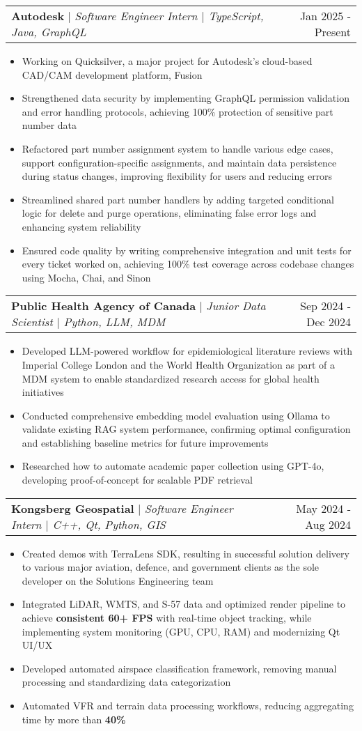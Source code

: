 \documentclass[letterpaper,10pt]{article}
\makeatletter
\newcommand{\resumeItem}[1]{
  \item\small{
    {#1 \vspace{-3pt}}
  }
}
\newcommand{\resumeSubheading}[3]{
    \item
    \begin{tabular*}{0.97\textwidth}[t]{l@{\extracolsep{\fill}}r}
      \textbf{#1} $|$ \textit{ #2} & #3 \\
    \end{tabular*}\vspace{-6pt}
}
\newcommand{\resumeItemListStart}{\begin{itemize}}
\newcommand{\resumeItemListEnd}{\end{itemize}\vspace{-5pt}}
\makeatother
\begin{document}
    \resumeSubheading{Autodesk}{Software Engineer Intern $|$ TypeScript, Java, GraphQL}{Jan 2025 - Present}
        \resumeItemListStart
            \resumeItem{Working on Quicksilver, a major project for Autodesk's cloud-based CAD/CAM development platform, Fusion}
            \resumeItem{Strengthened data security by implementing GraphQL permission validation and error handling protocols, achieving 100\% protection of sensitive part number data}
            \resumeItem{Refactored part number assignment system to handle various edge cases, support configuration-specific assignments, and maintain data persistence during status changes, improving flexibility for users and reducing errors}
            \resumeItem{Streamlined shared part number handlers by adding targeted conditional logic for delete and purge operations, eliminating false error logs and enhancing system reliability}
            \resumeItem{Ensured code quality by writing comprehensive integration and unit tests for every ticket worked on, achieving 100\% test coverage across codebase changes using Mocha, Chai, and Sinon}
    \resumeItemListEnd

    \resumeSubheading{Public Health Agency of Canada}{Junior Data Scientist $|$ Python, LLM, MDM}{Sep 2024 - Dec 2024}
      \resumeItemListStart
        \resumeItem{Developed LLM-powered workflow for epidemiological literature reviews with Imperial College London and the World Health Organization as part of a MDM system to enable standardized research access for global health initiatives}
        \resumeItem{Conducted comprehensive embedding model evaluation using Ollama to validate existing RAG system performance, confirming optimal configuration and establishing baseline metrics for future improvements}
        \resumeItem{Researched how to automate academic paper collection using GPT-4o, developing proof-of-concept for scalable PDF retrieval}
      \resumeItemListEnd

    \resumeSubheading{Kongsberg Geospatial}{Software Engineer Intern $|$ C++, Qt, Python, GIS}{May 2024 - Aug 2024}
      \resumeItemListStart
        \resumeItem{Created demos with TerraLens SDK, resulting in successful solution delivery to various major aviation, defence, and government clients as the sole developer on the Solutions Engineering team}
        \resumeItem{Integrated LiDAR, WMTS, and S-57 data and optimized render pipeline to achieve \textbf{consistent 60+ FPS} with real-time object tracking, while implementing system monitoring (GPU, CPU, RAM) and modernizing Qt UI/UX}
        \resumeItem{Developed automated airspace classification framework, removing manual processing and standardizing data categorization}
        \resumeItem{Automated VFR and terrain data processing workflows, reducing aggregating time by more than \textbf{40\%}}
      \resumeItemListEnd
\end{document}
